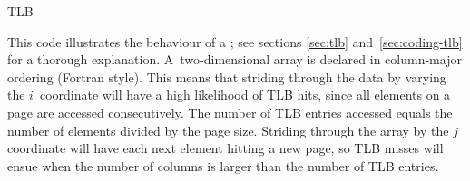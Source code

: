  {TLB}
\label{sec:tlb-code}

This code illustrates the behaviour of a ; see sections
\ref{sec:tlb} and~\ref{sec:coding-tlb} for a thorough
explanation. A~two-dimensional array is declared in column-major
ordering (Fortran style). This means that striding through the data by
varying the $i$~coordinate will have a high likelihood of TLB hits,
since all elements on a page are accessed consecutively. The number of
TLB entries accessed equals the number of elements divided by the page
size. Striding through the array by the $j$ coordinate will have each
next element hitting a new page, so TLB misses will ensue when the
number of columns is larger than the number of TLB entries.



